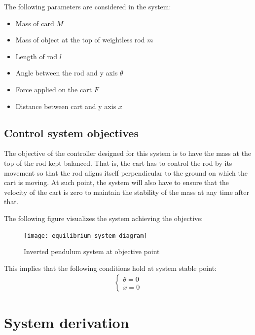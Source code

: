 \documentclass [12pt,letterpaper]{exam}
\begin{document}
The following parameters are considered in the system:
\begin{itemize}
    \item Mass of card $M$
    \item Mass of object at the top of weightless rod $m$
    \item Length of rod $l$
    \item Angle between the rod and y axis $\theta$
    \item Force applied on the cart $F$
    \item Distance between cart and y axis $x$
\end{itemize}

\subsection{Control system objectives}
The objective of the controller designed for this system is to have the mass at the top of the rod kept balanced. That is, the cart has to control the rod by its movement so that the rod aligns itself perpendicular to the ground on which the cart is moving. At such point, the system will also have to ensure that the velocity of the cart is zero to maintain the stability of the mass at any time after that.

The following figure visualizes the system achieving the objective:
\begin{figure}[H]
  \centering
    \texttt{[image: equilibrium\_system\_diagram]} 
  \caption{Inverted pendulum system at objective point}
  \label{fig:equilibrium_system_diagram}
\end{figure}

This implies that the following conditions hold at system stable point:
\begin{align}
\begin{cases}
\theta = 0 \\
\dot{x} = 0
\end{cases}
\end{align}

\newpage
\section{System derivation}
\end{document}
